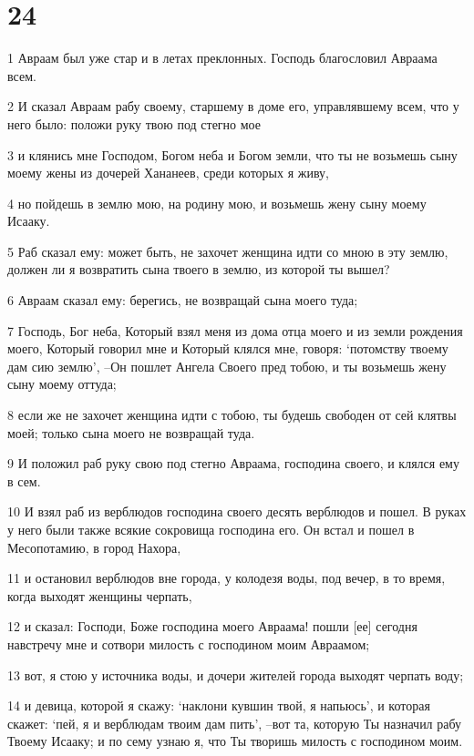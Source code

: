 \chapter{24}

\par 1 Авраам был уже стар и в летах преклонных. Господь благословил Авраама всем.
\par 2 И сказал Авраам рабу своему, старшему в доме его, управлявшему всем, что у него было: положи руку твою под стегно мое
\par 3 и клянись мне Господом, Богом неба и Богом земли, что ты не возьмешь сыну моему жены из дочерей Хананеев, среди которых я живу,
\par 4 но пойдешь в землю мою, на родину мою, и возьмешь жену сыну моему Исааку.
\par 5 Раб сказал ему: может быть, не захочет женщина идти со мною в эту землю, должен ли я возвратить сына твоего в землю, из которой ты вышел?
\par 6 Авраам сказал ему: берегись, не возвращай сына моего туда;
\par 7 Господь, Бог неба, Который взял меня из дома отца моего и из земли рождения моего, Который говорил мне и Который клялся мне, говоря: `потомству твоему дам сию землю', --Он пошлет Ангела Своего пред тобою, и ты возьмешь жену сыну моему оттуда;
\par 8 если же не захочет женщина идти с тобою, ты будешь свободен от сей клятвы моей; только сына моего не возвращай туда.
\par 9 И положил раб руку свою под стегно Авраама, господина своего, и клялся ему в сем.
\par 10 И взял раб из верблюдов господина своего десять верблюдов и пошел. В руках у него были также всякие сокровища господина его. Он встал и пошел в Месопотамию, в город Нахора,
\par 11 и остановил верблюдов вне города, у колодезя воды, под вечер, в то время, когда выходят женщины черпать,
\par 12 и сказал: Господи, Боже господина моего Авраама! пошли [ее] сегодня навстречу мне и сотвори милость с господином моим Авраамом;
\par 13 вот, я стою у источника воды, и дочери жителей города выходят черпать воду;
\par 14 и девица, которой я скажу: `наклони кувшин твой, я напьюсь', и которая скажет: `пей, я и верблюдам твоим дам пить', --вот та, которую Ты назначил рабу Твоему Исааку; и по сему узнаю я, что Ты творишь милость с господином моим.
